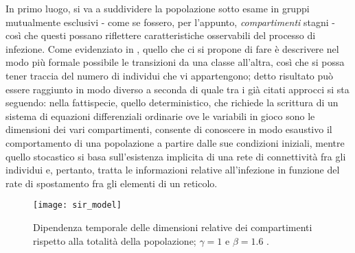 In primo luogo, si va a suddividere la popolazione sotto esame in gruppi mutualmente esclusivi - come se fossero, per l'appunto, \emph{compartimenti} stagni - così che questi possano riflettere caratteristiche osservabili del processo di infezione. Come evidenziato in \cite{Kiss}, quello che ci si propone di fare è descrivere nel modo più formale possibile le transizioni da una classe all'altra, così che si possa tener traccia del numero di individui che vi appartengono; detto risultato può essere raggiunto in modo diverso a seconda di quale tra i già citati approcci si sta seguendo: 
nella fattispecie, quello deterministico, che richiede la scrittura di un sistema di equazioni differenziali ordinarie ove le variabili in gioco sono le dimensioni dei vari compartimenti, consente di conoscere in modo esaustivo il comportamento di una popolazione a partire dalle sue condizioni iniziali, mentre quello stocastico si basa sull'esistenza implicita di una rete di connettività fra gli individui e, pertanto, tratta le informazioni relative all'infezione in funzione del rate di spostamento fra gli elementi di un reticolo.
\\
\begin{figure}
		\begin{center}
			\texttt{[image: sir\_model]}
			\caption{Dipendenza temporale delle dimensioni relative dei compartimenti rispetto alla totalità della popolazione; $ \gamma = 1 $ e $ \beta = 1.6 $ \cite{Kiss}.}
			\label{fig:evolution}
		\end{center}
	\end{figure}
	

